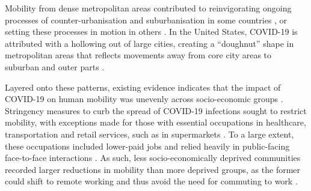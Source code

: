 \documentclass[fleqn,10pt]{wlscirep}
\begin{document}
Mobility from dense metropolitan areas contributed to reinvigorating ongoing processes of counter-urbanisation and suburbanisation in some countries \cite{rowe2023}, or setting these processes in motion in others \cite{halfacree2024counterurbanisation}. In the United States, COVID-19 is attributed with a hollowing out of large cities, creating a ``doughnut'' shape in metropolitan areas that reflects movements away from core city areas to suburban and outer parts \cite{ramani2024working}. %

Layered onto these patterns, existing evidence indicates that the impact of COVID-19 on human mobility was unevenly across socio-economic groups \cite{duenas2021changes, do2021association, elejalde2024}. Stringency measures to curb the spread of COVID-19 infections sought to restrict mobility, with exceptions made for those with essential occupations in healthcare, transportation and retail services, such as in supermarkets \cite{florida2021}. To a large extent, these occupations included lower-paid jobs and relied heavily in public-facing face-to-face interactions \cite{florida2021}. As such, less socio-economically deprived communities recorded larger reductions in mobility than more deprived groups, as the former could shift to remote working and thus avoid the need for commuting to work \cite{nathan2020}. %
\end{document}
